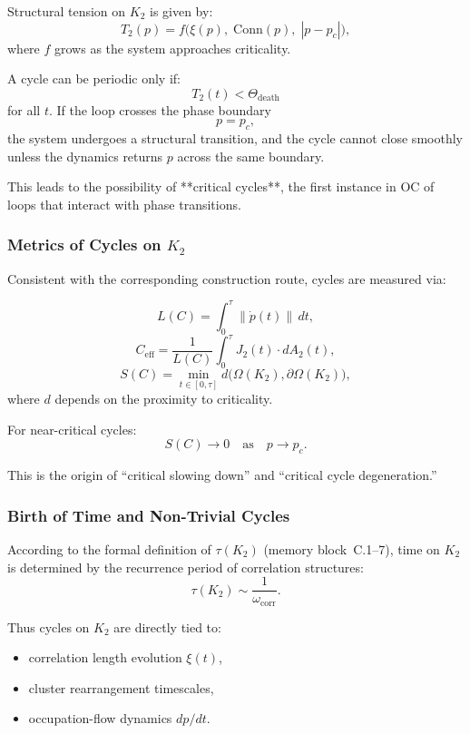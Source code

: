 Structural tension on $K_2$ is given by:
\[
  T_2(p)
  = f\bigl(\xi(p),\; \mathrm{Conn}(p),\;
       |p - p_c|\bigr),
\]
where $f$ grows as the system approaches criticality.

A cycle can be periodic only if:
\[
  T_2(t) < \Theta_{\mathrm{death}}
\]
for all $t$.
If the loop crosses the phase boundary
\[
  p = p_c,
\]
the system undergoes a structural transition, and the cycle cannot close
smoothly unless the dynamics returns $p$ across the same boundary.

This leads to the possibility of **critical cycles**, the first instance
in OC of loops that interact with phase transitions.

\subsubsection{Metrics of Cycles on \texorpdfstring{$K_2$}{K_2}}

Consistent with the corresponding construction route, cycles are measured via:

\[
  L(C)
  = \int_0^\tau \|\dot{p}(t)\|\, dt,
\]
\[
  C_{\mathrm{eff}}
  = \frac{1}{L(C)} \int_0^\tau J_2(t)\cdot dA_2(t),
\]
\[
  S(C) = \min_{t\in[0,\tau]} d\bigl(\Omega(K_2),\partial\Omega(K_2)\bigr),
\]
where $d$ depends on the proximity to criticality.

For near-critical cycles:
\[
  S(C) \to 0 \quad \text{as} \quad p\to p_c.
\]

This is the origin of ``critical slowing down'' and ``critical cycle
degeneration.''

\subsubsection{Birth of Time and Non-Trivial Cycles}

According to the formal definition of $\tau(K_2)$ (memory block~C.1–7),
time on $K_2$ is determined by the recurrence period of correlation
structures:
\[
  \tau(K_2) \sim \frac{1}{\omega_{\mathrm{corr}}}.
\]

Thus cycles on $K_2$ are directly tied to:

\begin{itemize}
  \item correlation length evolution $\xi(t)$,
  \item cluster rearrangement timescales,
  \item occupation-flow dynamics $dp/dt$.
\end{itemize}

